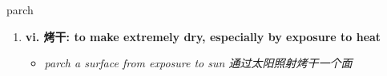 
\begin{frame}
{\huge parch}
\begin{center}
\begin{enumerate}\Large
  \item \textbf{vi. 烤干: to make extremely dry, especially by exposure to heat}
  \begin{itemize}
    \item \em{\Large{parch a surface from exposure to sun 通过太阳照射烤干一个面}}
  \end{itemize}
\end{enumerate}
\end{center}
\end{frame}
